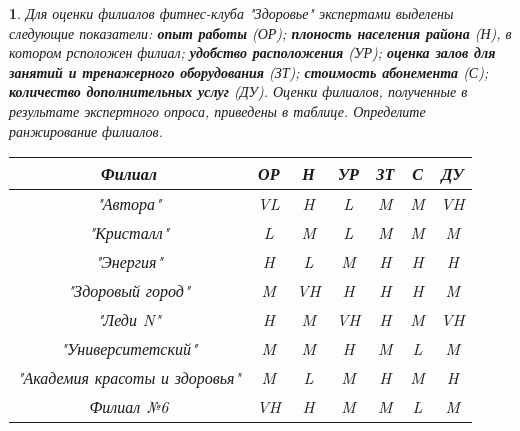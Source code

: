 \documentclass[11pt,a4paper,oneside]{article}
\newenvironment{problem}{
	\medskip
	\begin{problem-internal}
	}{
	\end{problem-internal}
}
\newtheorem{problem-internal}{}
\begin{document}
	\begin{problem}
		Для оценки филиалов фитнес-клуба "Здоровье" экспертами выделены следующие показатели: {\bf опыт работы} (ОР); {\bf плоность населения района} (Н), в котором рсположен филиал; {\bf удобство расположения} (УР); {\bf оценка залов для занятий и тренажерного оборудования} (ЗТ); {\bf стоимость абонемента} (С); {\bf количество дополнительных услуг} (ДУ). Оценки филиалов, полученные в результате экспертного опроса, приведены в таблице. Определите ранжирование филиалов.
		\begin{table}[!hbtp]
			\begin{tabular}{|c|c|c|c|c|c|c|}
				\hline
				Филиал                        & ОР & Н  & УР & ЗТ & С & ДУ \\ \hline
				"Автора"                      & VL & H  & L  & M  & M & VH \\ \hline
				"Кристалл"                    & L  & M  & L  & M  & M & M  \\ \hline
				"Энергия"                     & H  & L  & M  & H  & H & H  \\ \hline
				"Здоровый город"              & M  & VH & H  & H  & H & M  \\ \hline
				"Леди N"                      & H  & M  & VH & H  & M & VH \\ \hline
				"Университетский"             & M  & M  & H  & M  & L & M  \\ \hline
				"Академия красоты и здоровья" & M  & L  & M  & H  & M & H  \\ \hline
				Филиал №6                     & VH & H  & M  & M  & L & M  \\ \hline
			\end{tabular}
		\end{table}
	\end{problem}
\end{document}
